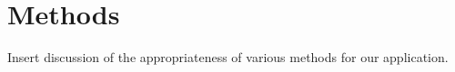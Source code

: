 \section{Methods}

Insert discussion of the appropriateness of various methods for our 
application.

